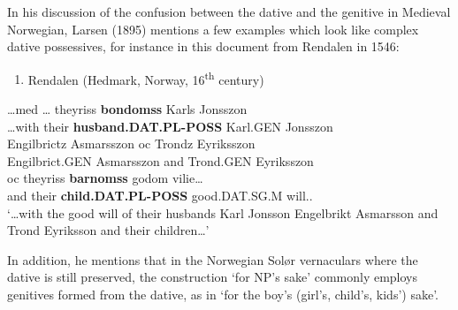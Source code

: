 In his discussion of the confusion between the dative and the genitive in Medieval Norwegian, Larsen (1895) mentions a few examples which look like complex dative possessives, for instance in this document from Rendalen in 1546:

\begin{enumerate} %
\item 
Rendalen (Hedmark, Norway, 16\textsuperscript{th} century)
\end{enumerate} %
\ea\label{}
\gll …med  …  theyriss  \textbf{bondomss} Karls  Jonsszon\\


…with    their  \textbf{husband.DAT.PL-POSS} Karl.GEN  Jonsszon\\ %


\ea\label{}
\gll Engilbrictz  Asmarsszon  oc  Trondz  Eyriksszon\\


Engilbrict.GEN  Asmarsszon  and  Trond.GEN   Eyriksszon\\ %


\ea\label{}
\gll oc  theyriss  \textbf{barnomss}  godom  vilie…\\


and  their  \textbf{child.DAT.PL-POSS} good.DAT.SG.M  will..\\ %


‘…with the good will of their husbands Karl Jonsson Engelbrikt Asmarsson and Trond Eyriksson and their children…’
\z


In addition, he mentions that in the Norwegian Solør vernaculars where the dative is still preserved, the construction ‘for NP’s sake’ commonly employs genitives formed from the dative, as in  ‘for the boy’s (girl’s, child’s, kids’) sake’. 

